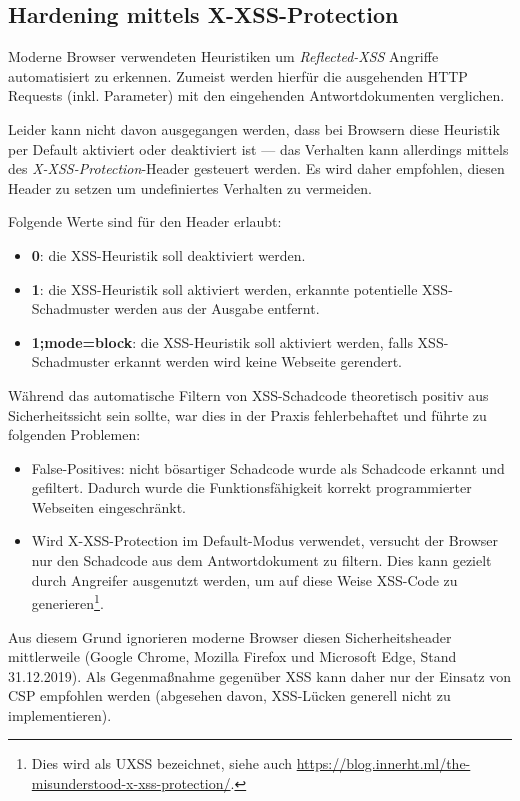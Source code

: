 \subsection{Hardening mittels X-XSS-Protection}
\label{x_xss_protection}

Moderne Browser verwendeten Heuristiken um \textit{Reflected-XSS} Angriffe automatisiert zu erkennen. Zumeist werden hierfür die ausgehenden HTTP Requests (inkl. Parameter) mit den eingehenden Antwortdokumenten verglichen.

Leider kann nicht davon ausgegangen werden, dass bei Browsern diese Heuristik per Default aktiviert oder deaktiviert ist --- das Verhalten kann allerdings mittels des \textit{X-XSS-Protection}-Header gesteuert werden. Es wird daher empfohlen, diesen Header zu setzen um undefiniertes Verhalten zu vermeiden.

Folgende Werte sind für den Header erlaubt:

\begin{itemize}
	\item \textbf{0}: die XSS-Heuristik soll deaktiviert werden.
	\item \textbf{1}: die XSS-Heuristik soll aktiviert werden, erkannte potentielle XSS-Schadmuster werden aus der Ausgabe entfernt.
	\item \textbf{1;mode=block}: die XSS-Heuristik soll aktiviert werden, falls XSS-Schadmuster erkannt werden wird keine Webseite gerendert.
\end{itemize}

Während das automatische Filtern von XSS-Schadcode theoretisch positiv aus Sicherheitssicht sein sollte, war dies in der Praxis fehlerbehaftet und führte zu folgenden Problemen:

\begin{itemize}
	\item False-Positives: nicht bösartiger Schadcode wurde als Schadcode erkannt und gefiltert. Dadurch wurde die Funktionsfähigkeit korrekt programmierter Webseiten eingeschränkt.
	\item Wird X-XSS-Protection im Default-Modus verwendet, versucht der Browser nur den Schadcode aus dem Antwortdokument zu filtern. Dies kann gezielt durch Angreifer ausgenutzt werden, um auf diese Weise XSS-Code zu generieren\footnote{Dies wird als UXSS bezeichnet, siehe auch \url{https://blog.innerht.ml/the-misunderstood-x-xss-protection/}.}.
\end{itemize}

Aus diesem Grund ignorieren moderne Browser diesen Sicherheitsheader mittlerweile (Google Chrome, Mozilla Firefox und Microsoft Edge, Stand 31.12.2019). Als Gegenmaßnahme gegenüber XSS kann daher nur der Einsatz von CSP empfohlen werden (abgesehen davon, XSS-Lücken generell nicht zu implementieren).

